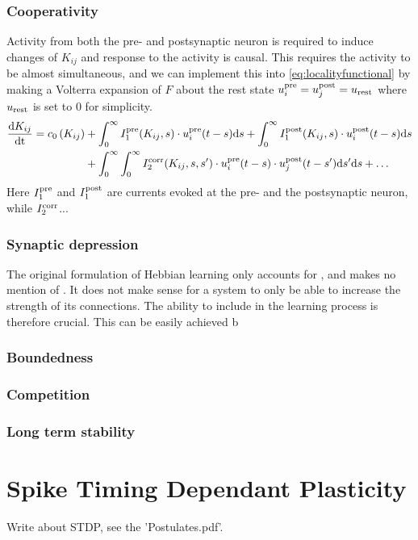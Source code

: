 \subsubsection{Cooperativity}
Activity from both the pre- and postsynaptic neuron is required to induce changes of $K_{ij}$ and response to the activity is causal. This requires the activity to be almost simultaneous, and we can implement this into \eqref{eq:localityfunctional} by making a Volterra expansion of $F$ about the rest state $u_i^{\rm pre} = u_j^{\rm post} = u_{\rm rest}$ where $u_{\rm rest}$ is set to 0 for simplicity.
\begin{align}
\frac{\mathrm{d} K_{i j}}{\mathrm{dt}} = c_{0}\left(K_{ij}\right) &+\int_{0}^{\infty} I_{1}^{\rm{pre}} (K_{ij}, s) \cdot u_{i}^{\rm{pre}}(t-s) \mathrm{d} s 
+\int_{0}^{\infty} I_{1}^{\rm{post}}(K_{i j}, s) \cdot u_{i}^{\rm{post}}(t-s) \mathrm{d} s \\ 
&+\int_{0}^{\infty} \int_{0}^{\infty} I_{2}^{\rm{corr}}(K_{ij}, s, s^{\prime}) \cdot u_{i}^{\rm{pre}}(t-s) \cdot u_{j}^{\rm{post}}(t-s^{\prime}) \mathrm{d} s^{\prime} \mathrm{d} s +\ldots
\end{align}
Here $I_1^{\rm pre}$ and $I_1^{\rm post}$ are currents evoked at the pre- and the postsynaptic neuron, while $I_2^{\rm corr}$...

\subsubsection{Synaptic depression}
The original formulation of Hebbian learning only accounts for \LTP, and makes no mention of \LTD. It does not make sense for a system to only be able to increase the strength of its connections. The ability to include \LTD in the learning process is therefore crucial. This can be easily achieved b

\subsubsection{Boundedness}

\subsubsection{Competition}

\subsubsection{Long term stability}


\section{Spike Timing Dependant Plasticity}
Write about STDP, see the 'Postulates.pdf'. \\

